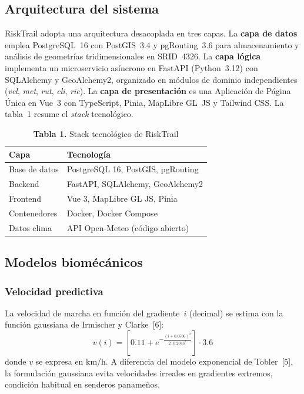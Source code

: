 \documentclass[10pt,letterpaper,twocolumn]{article}
\begin{document}
\subsection{Arquitectura del sistema}

RiskTrail adopta una arquitectura desacoplada en tres capas. La
\textbf{capa de datos} emplea PostgreSQL~16 con PostGIS~3.4 y
pgRouting~3.6 para almacenamiento y an\'{a}lisis de geometr\'{i}as
tridimensionales en SRID~4326. La \textbf{capa l\'{o}gica} implementa
un microservicio as\'{i}ncrono en FastAPI (Python~3.12) con SQLAlchemy y
GeoAlchemy2, organizado en m\'{o}dulos de dominio independientes
(\emph{vel}, \emph{met}, \emph{rut}, \emph{cli}, \emph{rie}). La
\textbf{capa de presentaci\'{o}n} es una Aplicaci\'{o}n de P\'{a}gina
\'{U}nica en Vue~3 con TypeScript, Pinia, MapLibre GL~JS y Tailwind CSS.
La tabla~1 resume el \textit{stack} tecnol\'{o}gico.

\begin{table}[H]
\centering
\caption{\textbf{Tabla 1.} Stack tecnol\'{o}gico de RiskTrail}
\label{tab:stack}
\begin{tabular}{@{}ll@{}}
\toprule
\textbf{Capa} & \textbf{Tecnolog\'{i}a} \\
\midrule
Base de datos & PostgreSQL 16, PostGIS, pgRouting \\
Backend       & FastAPI, SQLAlchemy, GeoAlchemy2 \\
Frontend      & Vue 3, MapLibre GL JS, Pinia \\
Contenedores  & Docker, Docker Compose \\
Datos clima   & API Open-Meteo (c\'{o}digo abierto) \\
\bottomrule
\end{tabular}
\end{table}

\subsection{Modelos biom\'{e}c\'{a}nicos}

\subsubsection{Velocidad predictiva}

La velocidad de marcha en funci\'{o}n del gradiente~$i$ (decimal) se
estima con la funci\'{o}n gaussiana de Irmischer y Clarke~[6]:
\begin{equation}
  v(i) = \!\left[0.11 + e^{-\frac{(i + 0.0506)^{2}}{2\cdot 0.2043^{2}}}\right]\!\cdot 3.6
  \label{eq:irmischer}
\end{equation}
donde $v$ se expresa en km/h. A diferencia del modelo exponencial de
Tobler~[5], la formulaci\'{o}n gaussiana evita velocidades irreales en
gradientes extremos, condici\'{o}n habitual en senderos paname\~{n}os.
\end{document}
